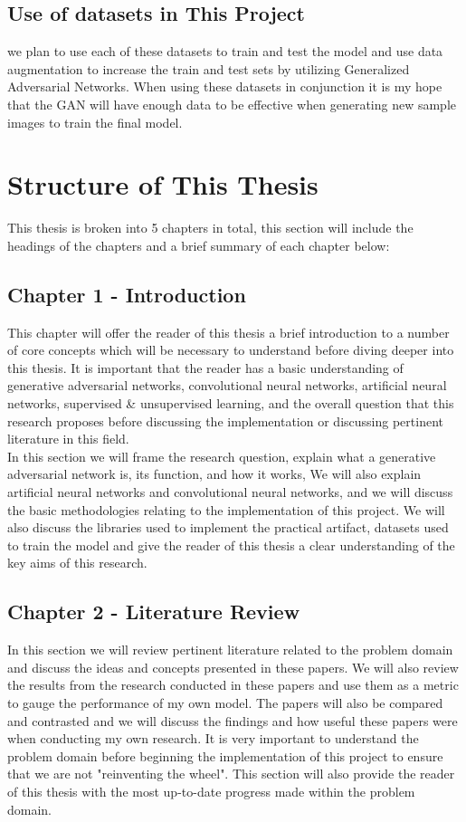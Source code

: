 \subsection{Use of datasets in This Project}
we plan to use each of these datasets to train and test the model and use data augmentation to increase the train and test sets by utilizing Generalized Adversarial Networks.  When using these datasets in conjunction it is my hope that the GAN will have enough data to be effective when generating new sample images to train the final model.

\section{Structure of This Thesis}
This thesis is broken into 5 chapters in total, this section will include the headings of the chapters and a brief summary of each chapter below:

\subsection{Chapter 1 - Introduction} 
This chapter will offer the reader of this thesis a brief introduction to a number of core concepts which will be necessary to understand before diving deeper into this thesis.  It is important that the reader has a basic understanding of generative adversarial networks, convolutional neural networks, artificial neural networks, supervised \& unsupervised learning, and the overall question that this research proposes before discussing the implementation or discussing pertinent literature in this field. 
\\
In this section we will frame the research question, explain what a generative adversarial network is, its function, and how it works,  We will also explain artificial neural networks and convolutional neural networks, and we will discuss the basic methodologies relating to the implementation of this project.  We will also discuss the libraries used to implement the practical artifact, datasets used to train the model and give the reader of this thesis a clear understanding of the key aims of this research.
\subsection{Chapter 2 - Literature Review} 
In this section we will review pertinent literature related to the problem domain and discuss the ideas and concepts presented in these papers. We will also review the results from the research conducted in these papers and use them as a metric to gauge the performance of my own model.  The papers will also be compared and contrasted and we will discuss the findings and how useful these papers were when conducting my own research.  It is very important to understand the problem domain before beginning the implementation of this project to ensure that we are not "reinventing the wheel".  This section will also provide the reader of this thesis with the most up-to-date progress made within the problem domain.
